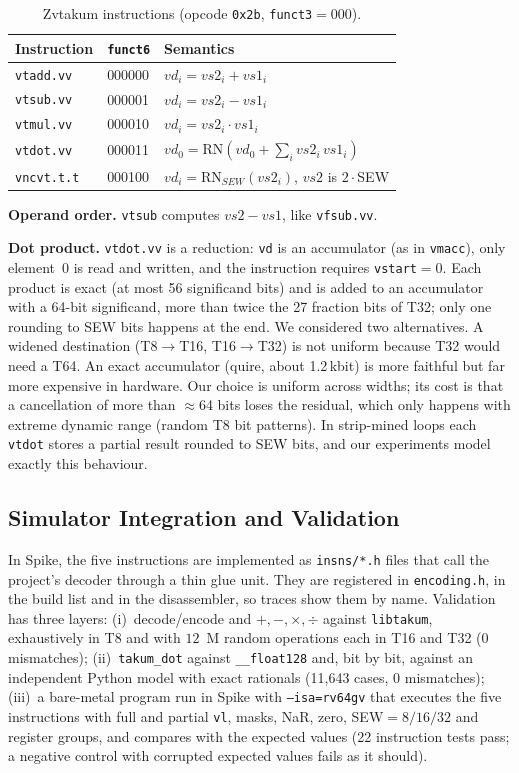 \documentclass[conference]{IEEEtran}
\begin{document}
\begin{table}[t]
\caption{Zvtakum instructions (opcode \texttt{0x2b}, \texttt{funct3}$=000$).}
\label{tab:zvt}
\centering
\small
\begin{tabular}{@{}lll@{}}
\toprule
Instruction & \texttt{funct6} & Semantics \\
\midrule
\texttt{vtadd.vv}  & 000000 & $vd_i = vs2_i + vs1_i$ \\
\texttt{vtsub.vv}  & 000001 & $vd_i = vs2_i - vs1_i$ \\
\texttt{vtmul.vv}  & 000010 & $vd_i = vs2_i \cdot vs1_i$ \\
\texttt{vtdot.vv}  & 000011 & $vd_0 = \mathrm{RN}(vd_0+\sum_i vs2_i\,vs1_i)$ \\
\texttt{vncvt.t.t} & 000100 & $vd_i=\mathrm{RN}_{SEW}(vs2_i)$, $vs2$ is $2\!\cdot\!$SEW \\
\bottomrule
\end{tabular}
\end{table}

\textbf{Operand order.} \texttt{vtsub} computes $vs2-vs1$, like \texttt{vfsub.vv}.

\textbf{Dot product.} \texttt{vtdot.vv} is a reduction: \texttt{vd} is an accumulator (as in \texttt{vmacc}), only
element~0 is read and written, and the instruction requires \texttt{vstart}$=0$. Each product is exact (at most 56
significand bits) and is added to an accumulator with a 64-bit significand, more than twice the 27 fraction bits of T32;
only one rounding to SEW bits happens at the end. We considered two alternatives. A widened destination
(T8$\rightarrow$T16, T16$\rightarrow$T32) is not uniform because T32 would need a T64. An exact accumulator (quire, about
1.2\,kbit) is more faithful but far more expensive in hardware. Our choice is uniform across widths; its cost is that a cancellation of more
than $\approx$64 bits loses the residual, which only happens with extreme dynamic range (random T8 bit patterns).
In strip-mined loops each \texttt{vtdot} stores a partial result rounded to SEW bits, and our experiments model exactly this behaviour.

\subsection{Simulator Integration and Validation}
In Spike, the five instructions are implemented as \texttt{insns/*.h} files that call the project's decoder
through a thin glue unit. They are registered in \texttt{encoding.h}, in the build list and in the
disassembler, so traces show them by name. Validation has three layers:
(i)~decode/encode and $+,-,\times,\div$ against \texttt{libtakum}, exhaustively in T8 and with $12$~M random operations each in T16 and T32 (0 mismatches);
(ii)~\texttt{takum\_dot} against \texttt{\_\_float128} and, bit by bit, against an independent Python model with exact rationals (11{,}643 cases, 0 mismatches);
(iii)~a bare-metal program run in Spike with \texttt{--isa=rv64gv} that executes the five instructions with full and partial \texttt{vl}, masks, NaR, zero,
SEW$=8/16/32$ and register groups, and compares with the expected values (22 instruction tests pass; a negative control with corrupted
expected values fails as it should).
\end{document}
